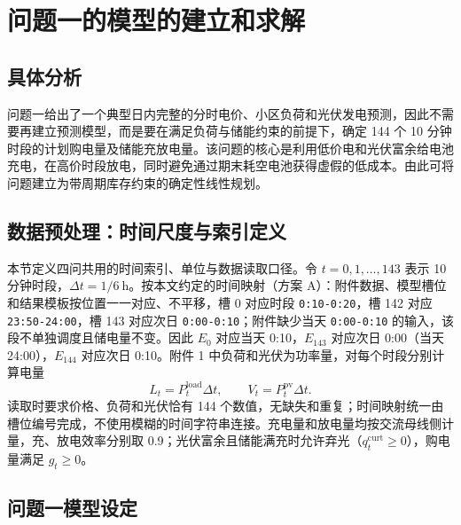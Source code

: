 \documentclass[withoutpreface,bwprint]{cumcmthesis}
\begin{document}
\section{问题一的模型的建立和求解}
\subsection{具体分析}

问题一给出了一个典型日内完整的分时电价、小区负荷和光伏发电预测，因此不需要再建立预测模型，而是要在满足负荷与储能约束的前提下，确定 144 个 10 分钟时段的计划购电量及储能充放电量。该问题的核心是利用低价电和光伏富余给电池充电，在高价时段放电，同时避免通过期末耗空电池获得虚假的低成本。由此可将问题建立为带周期库存约束的确定性线性规划。

\subsection{数据预处理：时间尺度与索引定义}

本节定义四问共用的时间索引、单位与数据读取口径。令 $t=0,1,\ldots,143$ 表示 10 分钟时段，$\Delta t=1/6\ \mathrm{h}$。按本文约定的时间映射（方案 A）：附件数据、模型槽位和结果模板按位置一一对应、不平移，槽 0 对应时段 \texttt{0:10-0:20}，槽 142 对应 \texttt{23:50-24:00}，槽 143 对应次日 \texttt{0:00-0:10}；附件缺少当天 \texttt{0:00-0:10} 的输入，该段不单独调度且储电量不变。因此 $E_0$ 对应当天 0:10，$E_{143}$ 对应次日 0:00（当天 24:00），$E_{144}$ 对应次日 0:10。附件 1 中负荷和光伏为功率量，对每个时段分别计算电量
\begin{equation}
L_t=P_t^{\mathrm{load}}\Delta t,\qquad
V_t=P_t^{\mathrm{pv}}\Delta t. \label{eq:q1_energy}
\end{equation}
读取时要求价格、负荷和光伏恰有 144 个数值，无缺失和重复；时间映射统一由槽位编号完成，不使用模糊的时间字符串连接。充电量和放电量均按交流母线侧计量，充、放电效率分别取 0.9；光伏富余且储能满充时允许弃光（$q_t^{\mathrm{curt}}\ge0$），购电量满足 $g_t\ge0$。

\subsection{问题一模型设定}
\end{document}
